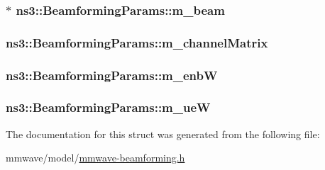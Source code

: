 \subsubsection[{\texorpdfstring{m\+\_\+beam}{m_beam}}]{$\ast$ ns3\+::\+Beamforming\+Params\+::m\+\_\+beam}\hypertarget{structns3_1_1BeamformingParams_a61d7ab0e34f1dc99b54499d40ba82478}{}\label{structns3_1_1BeamformingParams_a61d7ab0e34f1dc99b54499d40ba82478}
\subsubsection[{\texorpdfstring{m\+\_\+channel\+Matrix}{m_channelMatrix}}]{ ns3\+::\+Beamforming\+Params\+::m\+\_\+channel\+Matrix}\hypertarget{structns3_1_1BeamformingParams_af70d94a1f6a7317d20897158eed1f391}{}\label{structns3_1_1BeamformingParams_af70d94a1f6a7317d20897158eed1f391}
\subsubsection[{\texorpdfstring{m\+\_\+enbW}{m_enbW}}]{ ns3\+::\+Beamforming\+Params\+::m\+\_\+enbW}\hypertarget{structns3_1_1BeamformingParams_acf5be5fe531aa4952eeaea17f2dd9b6d}{}\label{structns3_1_1BeamformingParams_acf5be5fe531aa4952eeaea17f2dd9b6d}
\subsubsection[{\texorpdfstring{m\+\_\+ueW}{m_ueW}}]{ ns3\+::\+Beamforming\+Params\+::m\+\_\+ueW}\hypertarget{structns3_1_1BeamformingParams_a97c8af6224a21db36501eef88b6d8c31}{}\label{structns3_1_1BeamformingParams_a97c8af6224a21db36501eef88b6d8c31}


The documentation for this struct was generated from the following file\+:\begin{DoxyCompactItemize}
\item 
mmwave/model/\hyperlink{mmwave-beamforming_8h}{mmwave-\/beamforming.\+h}\end{DoxyCompactItemize}
